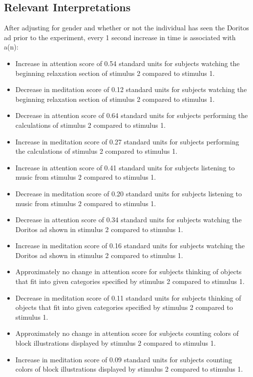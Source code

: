 \documentclass{article}[12pt]
\begin{document}


\subsection{Relevant Interpretations}

\noindent After adjusting for gender and whether or not the individual has seen the Doritos ad prior to the experiment, every 1 second increase in time is associated with a(n): 
\begin{itemize}
\item Increase in attention score of 0.54 standard units for subjects watching the beginning relaxation section of stimulus 2 compared to stimulus 1.

\item Decrease in meditation score of 0.12 standard units for subjects watching the beginning relaxation section of stimulus 2 compared to stimulus 1.
\item Decrease in attention score of 0.64 standard units for subjects performing the calculations of stimulus 2 compared to stimulus 1.
\item Increase in meditation score of 0.27 standard units for subjects performing the calculations of stimulus 2 compared to stimulus 1.
\item Increase in attention score of 0.41 standard units for subjects listening to music from stimulus 2 compared to stimulus 1.
\item Decrease in meditation score of 0.20 standard units for subjects listening to music from stimulus 2 compared to stimulus 1.
\item Decrease in attention score of 0.34 standard units for subjects watching the Doritos ad shown in stimulus 2 compared to stimulus 1.
\item Increase in meditation score of 0.16 standard units for subjects watching the Doritos ad shown in stimulus 2 compared to stimulus 1.
\item Approximately no change in attention score for subjects thinking of objects that fit into given categories specified by stimulus 2 compared to stimulus 1.
\item Decrease in meditation score of 0.11 standard units for subjects thinking of objects that fit into given categories specified by stimulus 2 compared to stimulus 1.
\item Approximately no change in attention score for subjects counting colors of block illustrations displayed by stimulus 2 compared to stimulus 1.
\item Increase in meditation score of 0.09 standard units for subjects counting colors of block illustrations displayed by stimulus 2 compared to stimulus 1.
\end{itemize}
\end{document}
